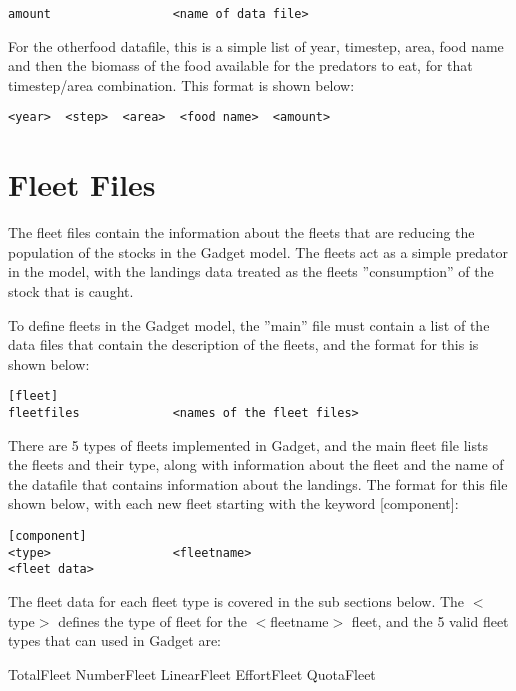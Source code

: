 \documentclass[10pt,twoside]{book}
\begin{document}
{\small\begin{verbatim}
amount                 <name of data file>
\end{verbatim}}

For the otherfood datafile, this is a simple list of year, timestep, area, food name and then the biomass of the food available for the predators to eat, for that timestep/area combination.  This format is shown below:

{\small\begin{verbatim}
<year>  <step>  <area>  <food name>  <amount>
\end{verbatim}}

\chapter{Fleet Files}\label{chap:fleet}
The fleet files contain the information about the fleets that are reducing the population of the stocks in the Gadget model.  The fleets act as a simple predator in the model, with the landings data treated as the fleets ''consumption'' of the stock that is caught.

\bigskip
To define fleets in the Gadget model, the ''main'' file must contain a list of the data files that contain the description of the fleets, and the format for this is shown below:

{\small\begin{verbatim}
[fleet]
fleetfiles             <names of the fleet files>
\end{verbatim}}

There are 5 types of fleets implemented in Gadget, and the main fleet file lists the fleets and their type, along with information about the fleet and the name of the datafile that contains information about the landings.  The format for this file shown below, with each new fleet starting with the keyword [component]:

{\small\begin{verbatim}
[component]
<type>                 <fleetname>
<fleet data>
\end{verbatim}}

The fleet data for each fleet type is covered in the sub sections below.  The $<$type$>$ defines the type of fleet for the $<$fleetname$>$ fleet, and the 5 valid fleet types that can used in Gadget are:

\bigskip
TotalFleet\newline
NumberFleet\newline
LinearFleet\newline
EffortFleet\newline
QuotaFleet
\end{document}
